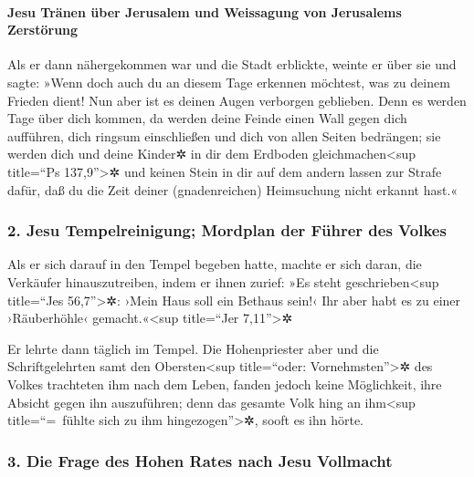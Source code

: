 \hypertarget{jesu-truxe4nen-uxfcber-jerusalem-und-weissagung-von-jerusalems-zerstuxf6rung}{%
\paragraph{Jesu Tränen über Jerusalem und Weissagung von Jerusalems
Zerstörung}\label{jesu-truxe4nen-uxfcber-jerusalem-und-weissagung-von-jerusalems-zerstuxf6rung}}

 Als er dann nähergekommen war und die Stadt erblickte,
weinte er über sie  und sagte: »Wenn doch auch du an
diesem Tage erkennen möchtest, was zu deinem Frieden dient! Nun aber ist
es deinen Augen verborgen geblieben.  Denn es werden Tage
über dich kommen, da werden deine Feinde einen Wall gegen dich
aufführen, dich ringsum einschließen und dich von allen Seiten
bedrängen;  sie werden dich und deine Kinder✲ in dir dem
Erdboden gleichmachen\textless sup title=``Ps 137,9''\textgreater✲ und
keinen Stein in dir auf dem andern lassen zur Strafe dafür, daß du die
Zeit deiner (gnadenreichen) Heimsuchung nicht erkannt hast.«

\hypertarget{jesu-tempelreinigung-mordplan-der-fuxfchrer-des-volkes}{%
\subsubsection{2. Jesu Tempelreinigung; Mordplan der Führer des
Volkes}\label{jesu-tempelreinigung-mordplan-der-fuxfchrer-des-volkes}}

 Als er sich darauf in den Tempel begeben hatte, machte
er sich daran, die Verkäufer hinauszutreiben,  indem er
ihnen zurief: »Es steht geschrieben\textless sup title=``Jes
56,7''\textgreater✲: ›Mein Haus soll ein Bethaus sein!‹ Ihr aber habt es
zu einer ›Räuberhöhle‹ gemacht.«\textless sup title=``Jer
7,11''\textgreater✲

 Er lehrte dann täglich im Tempel. Die Hohenpriester aber
und die Schriftgelehrten samt den Obersten\textless sup title=``oder:
Vornehmsten''\textgreater✲ des Volkes trachteten ihm nach dem Leben,
 fanden jedoch keine Möglichkeit, ihre Absicht gegen ihn
auszuführen; denn das gesamte Volk hing an ihm\textless sup
title=``=~fühlte sich zu ihm hingezogen''\textgreater✲, sooft es ihn
hörte.

\hypertarget{die-frage-des-hohen-rates-nach-jesu-vollmacht}{%
\subsubsection{3. Die Frage des Hohen Rates nach Jesu
Vollmacht}\label{die-frage-des-hohen-rates-nach-jesu-vollmacht}}

